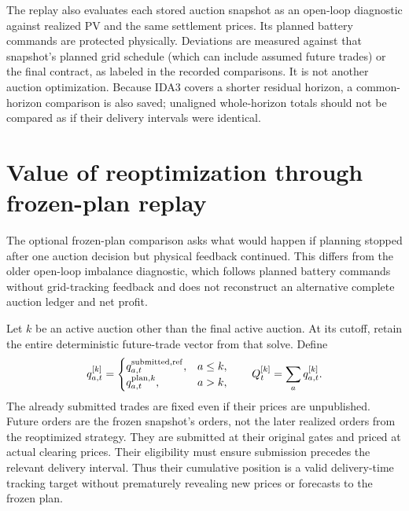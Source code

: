 \documentclass[11pt,a4paper]{article}
\begin{document}
The replay also evaluates each stored auction snapshot as an open-loop diagnostic
against realized PV and the same settlement prices. Its planned battery commands
are protected physically. Deviations are measured against that snapshot's planned
grid schedule (which can include assumed future trades) or the final contract,
as labeled in the recorded comparisons. It is not another auction
optimization. Because IDA3 covers a shorter residual horizon, a common-horizon
comparison is also saved; unaligned whole-horizon totals should not be compared
as if their delivery intervals were identical.

\section{Value of reoptimization through frozen-plan replay}

The optional frozen-plan comparison asks what would happen if planning stopped
after one auction decision but physical feedback continued. This differs from
the older open-loop imbalance diagnostic, which follows planned battery commands
without grid-tracking feedback and does not reconstruct an alternative complete
auction ledger and net profit.

Let $k$ be an active auction other than the final active auction. At its cutoff,
retain the entire deterministic future-trade vector from that solve. Define
\begin{equation}
 q^{[k]}_{a,t}=
 \begin{cases}
 q^{\rm submitted,ref}_{a,t},&a\le k,\\
 q^{\mathrm{plan},k}_{a,t},&a>k,
 \end{cases}
 \qquad Q^{[k]}_t=\sum_a q^{[k]}_{a,t}.
\end{equation}
The already submitted trades are fixed even if their prices are unpublished.
Future orders are the frozen snapshot's orders, not the later realized orders
from the reoptimized strategy. They are submitted at their original gates and
priced at actual clearing prices. Their eligibility must ensure submission
precedes the relevant delivery interval. Thus their cumulative position is a
valid delivery-time tracking target without prematurely revealing new prices or
forecasts to the frozen plan.
\end{document}
